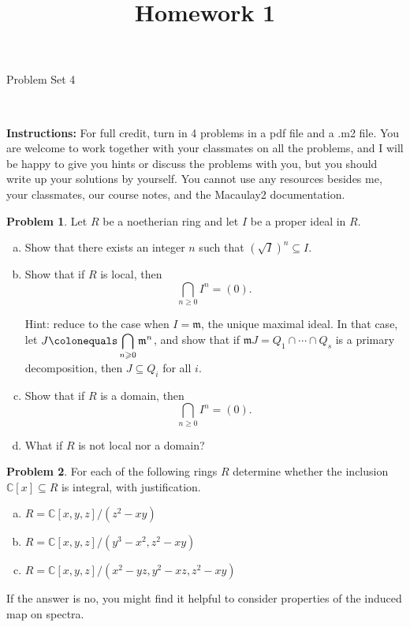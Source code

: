 \documentclass[11pt]{article}
\title{}
\date{\vspace{-0.5in}}
\title{Homework 1}
\newcommand{\m}{\mathfrak{m}}
\newcommand{\C}{\mathbb{C}}
\theoremstyle{definition}
\newtheorem{problem}{Problem}
\begin{document}
\thispagestyle{fancy}
\pagestyle{fancy}

\vspace{3em}

\begin{center}
	{\LARGE Problem Set 4}
\end{center}

\

\noindent
{\bf Instructions:}
For full credit, turn in 4 problems in a pdf file and a .m2 file. 
You are welcome to work together with your classmates on all the problems, and I will be happy to give you hints or discuss the problems with you, but you should write up your solutions by yourself.
You cannot use any resources besides me, your classmates, our course notes, and the Macaulay2 documentation.


\vspace{2em}


\begin{problem}
	Let $R$ be a noetherian ring and let $I$ be a proper ideal in $R$.
	\begin{enumerate}[a)]
		\item Show that there exists an integer $n$ such that $(\sqrt{I})^n \subseteq I$.
		\item Show that if $R$ is local, then
		$$\bigcap_{n \geqslant 0} I^n = (0).$$
		
		\noindent
		Hint: reduce to the case when $I = \m$, the unique maximal ideal. In that case, let $J \colonequals \displaystyle\bigcap_{n\geqslant 0} \m^n$, and show that if $\m J = Q_1 \cap \cdots \cap Q_s$ is a primary decomposition, then $J \subseteq Q_i$ for all $i$.
		
		\item Show that if $R$ is a domain, then
		$$\bigcap_{n \geqslant 0} I^n = (0).$$
		\item What if $R$ is not local nor a domain?
	\end{enumerate}
\end{problem}



\vfill



\begin{problem}
For each of the following rings $R$ determine whether the inclusion $\C[x] \subseteq R$ is integral, with justification. 
\begin{enumerate}[a)]
\item $R=\C[x,y,z]/(z^2-xy)$
\item $R=\C[x,y,z]/(y^3-x^2, z^2-xy)$
\item $R=\C[x,y,z]/(x^2-yz, y^2-xz, z^2-xy)$
\end{enumerate}
If the answer is no, you might find it helpful to consider properties of the induced map on spectra.
\end{problem}
\end{document}

